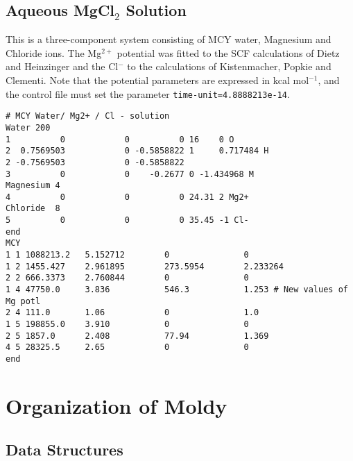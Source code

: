 \section{Aqueous MgCl$_2$ Solution}%
This is a three-component system consisting of MCY
water\cite{matsuoka:75}, Magnesium and Chloride ions.  The Mg$^{2+}$
potential was fitted to the SCF calculations of Dietz and
Heinzinger\cite{dietz:82} and the Cl$^-$ to the calculations of
Kistenmacher, Popkie and Clementi\cite{kistenmacher:73b}.  Note that
the potential parameters are expressed in kcal mol$^{-1}$, and the
control file must set the parameter \verb'time-unit=4.8888213e-14'.
\begin{verbatim}
# MCY Water/ Mg2+ / Cl - solution
Water 200
1          0            0          0 16    0 O
2  0.7569503            0 -0.5858822 1     0.717484 H
2 -0.7569503            0 -0.5858822
3          0            0    -0.2677 0 -1.434968 M
Magnesium 4
4          0            0          0 24.31 2 Mg2+
Chloride  8
5          0            0          0 35.45 -1 Cl-
end
MCY
1 1 1088213.2   5.152712        0               0
1 2 1455.427    2.961895        273.5954        2.233264
2 2 666.3373    2.760844        0               0
1 4 47750.0     3.836           546.3           1.253 # New values of Mg potl
2 4 111.0       1.06            0               1.0   
1 5 198855.0    3.910           0               0
2 5 1857.0      2.408           77.94           1.369
4 5 28325.5     2.65            0               0
end
\end{verbatim}
\chapter{Organization of Moldy} %
\section{Data Structures}%
\label{sec:structs}
